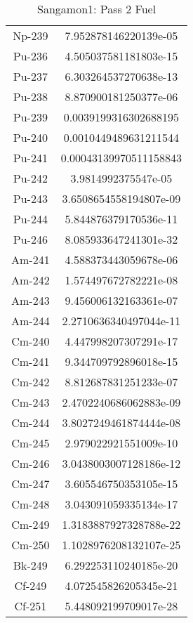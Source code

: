 \begin{table}[h!]
\begin{tabular}{|| c || c |}
Np-239 & 7.952878146220139e-05 \\
Pu-236 & 4.505037581181803e-15 \\
Pu-237 & 6.303264537270638e-13 \\
Pu-238 & 8.870900181250377e-06 \\
Pu-239 & 0.0039199316302688195 \\
Pu-240 & 0.0010449489631211544 \\
Pu-241 & 0.00043139970511158843 \\
Pu-242 & 3.9814992375547e-05 \\
Pu-243 & 3.6508654558194807e-09 \\
Pu-244 & 5.844876379170536e-11 \\
Pu-246 & 8.085933647241301e-32 \\
Am-241 & 4.588373443059678e-06 \\
Am-242 & 1.574497672782221e-08 \\
Am-243 & 9.456006132163361e-07 \\
Am-244 & 2.2710636340497044e-11 \\
Cm-240 & 4.447998207307291e-17 \\
Cm-241 & 9.344709792896018e-15 \\
Cm-242 & 8.812687831251233e-07 \\
Cm-243 & 2.4702240686062883e-09 \\
Cm-244 & 3.8027249461874444e-08 \\
Cm-245 & 2.979022921551009e-10 \\
Cm-246 & 3.0438003007128186e-12 \\
Cm-247 & 3.605546750353105e-15 \\
Cm-248 & 3.043091059335134e-17 \\
Cm-249 & 1.3183887927328788e-22 \\
Cm-250 & 1.1028976208132107e-25 \\
Bk-249 & 6.292253110240185e-20 \\
Cf-249 & 4.072545826205345e-21 \\
Cf-251 & 5.448092199709017e-28 \\

\hline
\end{tabular}
\caption{Sangamon1: Pass 2 Fuel}
\label{table:sang1p2fuel}
\end{table}